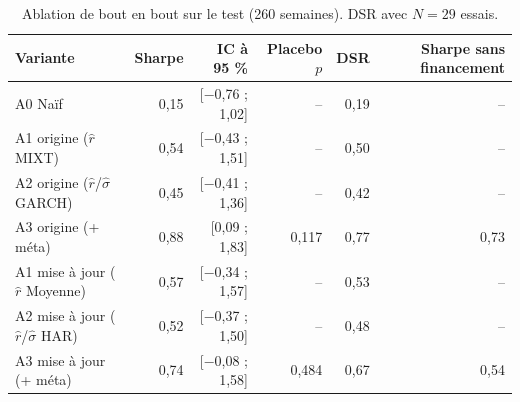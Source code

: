 \begin{table}[ht]
\centering
\small
\caption{Ablation de bout en bout sur le test (260 semaines). DSR avec $N = 29$ essais.}
\label{tab:ablation}
\begin{tabular}{lrrrrr}
\toprule
Variante & Sharpe & IC à 95 \% & Placebo $p$ & DSR & Sharpe sans financement \\
\midrule
A0 Naïf & 0,15 & [$-$0,76 ; 1,02] & -- & 0,19 & -- \\
A1 origine ($\hat r$ MIXT) & 0,54 & [$-$0,43 ; 1,51] & -- & 0,50 & -- \\
A2 origine ($\hat r$/$\hat\sigma$ GARCH) & 0,45 & [$-$0,41 ; 1,36] & -- & 0,42 & -- \\
A3 origine (+ méta) & 0,88 & [0,09 ; 1,83] & 0,117 & 0,77 & 0,73 \\
A1 mise à jour ($\hat r$ Moyenne) & 0,57 & [$-$0,34 ; 1,57] & -- & 0,53 & -- \\
A2 mise à jour ($\hat r$/$\hat\sigma$ HAR) & 0,52 & [$-$0,37 ; 1,50] & -- & 0,48 & -- \\
A3 mise à jour (+ méta) & 0,74 & [$-$0,08 ; 1,58] & 0,484 & 0,67 & 0,54 \\
\bottomrule
\end{tabular}
\end{table}
